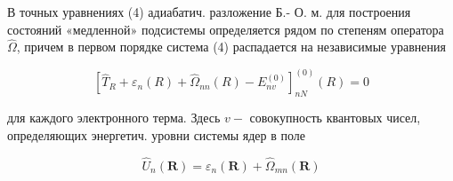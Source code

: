 \documentclass[10pt]{article}
\begin{document}
В точных уравнениях (4) адиабатич. разложение Б.- О. м. для построения состояний «медленной» подсистемы определяется рядом по степеням оператора $\hat{\Omega}$, причем в первом порядке система (4) распадается на независимые уравнения



\[

\left[\hat{T}_{R}+\varepsilon_{n}(R)+\hat{\Omega}_{n n}(R)-E_{n v}^{(0)}\right]_{n N}^{(0)}(R)=0

\]



для каждого электронного терма. Здесь $v-$ совокупность квантовых чисел, определяющих энергетич. уровни системы ядер в поле



\[

\hat{U}_{n}(\boldsymbol{R})=\varepsilon_{n}(\boldsymbol{R})+\hat{\Omega}_{m n}(\boldsymbol{R})

\]
\end{document}
